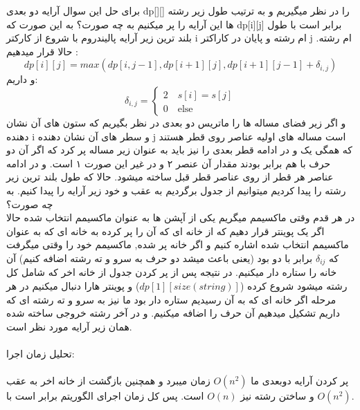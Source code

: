 \problem{}
برای حل این سوال آرایه دو بعدی dp[][] را در نظر میگیریم
و به ترتیب طول زیر رشته ها این آرایه را پر میکنیم به چه صورت؟
به این صورت که dp[i][j]
 برابر است با طول بلند ترین زیر آرایه پالیندروم 
 با شروع از کارکتر i ام رشته و پایان در کاراکتر j ام رشته.
حالا قرار میدهیم :\\
\[
    dp[i][j] = max(dp[i,j-1],dp[i+1][j],dp[i+1][j-1]+\delta_{i,j})    
\]
و داریم:\\
\[
    \delta_{i,j}=
    \begin{cases}
        2 \quad  s[i]=s[j]\\
        0 \quad  \text{else}
    \end{cases}
\]
و اگر زیر فضای مساله ها را ماتریس دو بعدی در نظر بگیریم که ستون های آن نشان دهنده i و
سطر های آن نشان دهنده j است
مساله های اولیه عناصر روی قطر هستند
که همگی یک و در ادامه قطر بعدی را نیز باید به عنوان زیر مساله پر کرد که اگر آن دو حرف با هم برابر بودند
مقدار آن عنصر ۲ و در غیر این صورت ۱ است.
و در ادامه عناصر هر قطر از روی عناصر قطر قبل ساخته میشود.
حالا که طول بلند ترین زیر رشته را پیدا کردیم میتوانیم از جدول برگردیم به عقب و خود زیر آرایه
را پیدا کنیم.
به چه صورت؟\\
در هر قدم وقتی ماکسیمم میگریم یکی از آپشن ها به عنوان ماکسیمم انتخاب شده
حالا اگر یک پوینتر قرار دهیم که از خانه ای که آن را پر کرده به خانه ای که به عنوان ماکسیمم انتخاب
شده اشاره کنیم و اگر خانه پر شده, ماکسیمم خود را وقتی میگرفت که $\delta_{ij}$
برابر با دو بود (یعنی باعث میشد دو حرف به سرو و ته رشته اضافه کنیم)
آن خانه را ستاره دار میکنیم.
 در نتیجه
پس از پر کردن جدول
از خانه اخر که شامل کل رشته میشود شروع کرده
($dp[1][size(string)]$)
و پوینتر هارا دنبال میکنیم
در هر مرحله اگر خانه ای که به آن رسیدیم ستاره دار بود 
ما نیز به سرو و ته رشته ای که داریم تشکیل میدهیم
آن حرف را اضافه میکنیم.
و در آخر رشته خروجی ساخته شده همان زیر آرایه مورد نظر است.
\\\\
تحلیل زمان اجرا:\\\\
پر کردن آرایه دوبعدی ما $O(n^2)$ زمان میبرد و همچنین
بازگشت از خانه اخر به عقب و ساختن رشته نیز $O(n)$ است.
پس کل زمان اجرای الگوریتم برابر است با $O(n^2)$.
